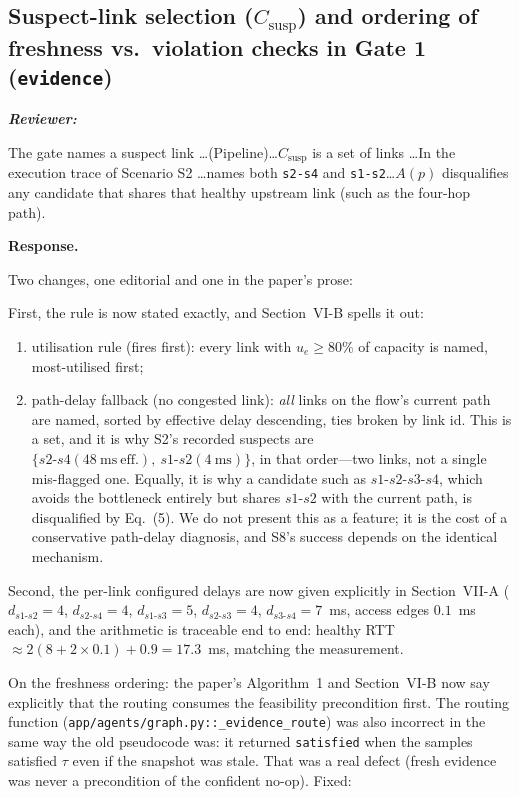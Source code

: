 \documentclass[11pt,a4paper]{article}
\newenvironment{reviewer}{\par\medskip\noindent\begin{minipage}{\linewidth}\small\itshape\color{quote}\textbf{Reviewer:}\par}{\end{minipage}\medskip\par}
\newenvironment{response}{\par\noindent\begin{minipage}{\linewidth}\small\textbf{Response.}\par}{\end{minipage}\medskip\par}
\begin{document}
\subsection{Suspect-link selection ($C_{\mathrm{susp}}$) and ordering of
freshness vs.\ violation checks in Gate 1 (\texttt{evidence})}

\begin{reviewer}
The gate names a suspect link \dots (Pipeline)\dots $C_{\mathrm{susp}}$ is a
set of links \dots In the execution trace of Scenario S2 \dots names both
\texttt{s2-s4} and \texttt{s1-s2}\dots $A(p)$ disqualifies any candidate
that shares that healthy upstream link (such as the four-hop path).
\end{reviewer}

\begin{response}
Two changes, one editorial and one in the paper's prose:

First, the rule is now stated exactly, and Section~VI-B spells it out:

\begin{enumerate}
  \item utilisation rule (fires first): every link with
    $u_e \ge 80\%$ of capacity is named, most-utilised first;
  \item path-delay fallback (no congested link): \emph{all} links on the
    flow's current path are named, sorted by effective delay descending,
    ties broken by link id. This is a set, and it is why S2's recorded
    suspects are $\{s2\text{-}s4 (48~\mathrm{ms}\ \mathrm{eff.}),\ s1\text{-}s2
    (4~\mathrm{ms})\}$, in that order---two links, not a single mis-flagged
    one. Equally, it is why a candidate such as $s1$-$s2$-$s3$-$s4$, which
    avoids the bottleneck entirely but shares $s1$-$s2$ with the current
    path, is disqualified by Eq.~(5). We do not present this as a feature;
    it is the cost of a conservative path-delay diagnosis, and S8's success
    depends on the identical mechanism.
\end{enumerate}

Second, the per-link configured delays are now given explicitly in
Section~VII-A ($d_{s1\text{-}s2}=4$, $d_{s2\text{-}s4}=4$,
$d_{s1\text{-}s3}=5$, $d_{s2\text{-}s3}=4$, $d_{s3\text{-}s4}=7$~ms, access
edges $0.1$~ms each), and the arithmetic is traceable end to end: healthy
RTT $\approx 2(8 + 2{\times}0.1) + 0.9 = 17.3$~ms, matching the
measurement.

On the freshness ordering: the paper's Algorithm~1 and Section~VI-B now say
explicitly that the routing consumes the feasibility precondition first. The
routing function (\texttt{app/agents/graph.py::\_evidence\_route}) was also
incorrect in the same way the old pseudocode was: it returned
\texttt{satisfied} when the samples satisfied $\tau$ even if the snapshot
was stale. That was a real defect (fresh evidence was never a precondition
of the confident no-op). Fixed:


\end{response}
\end{document}
